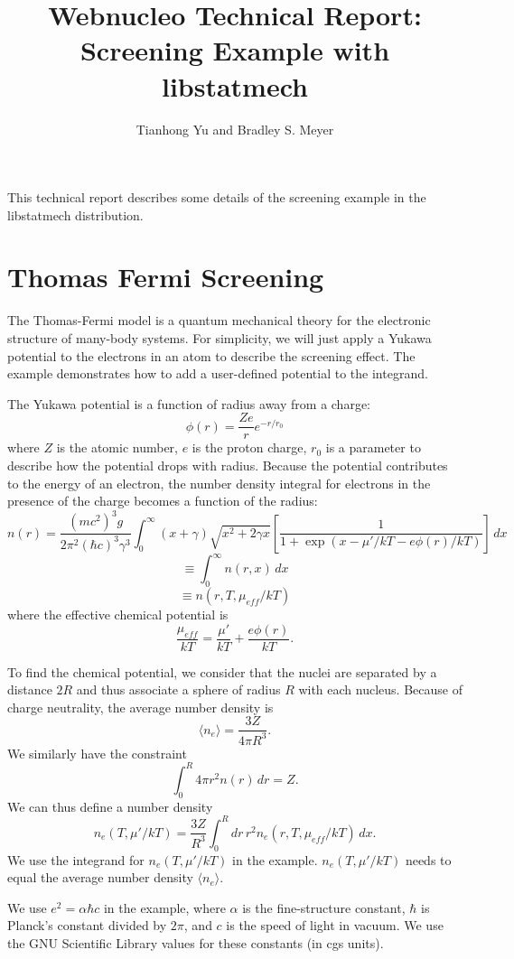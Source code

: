 \documentclass[pdftex]{article}    %
\title{Webnucleo Technical Report: Screening Example with libstatmech}  %
\author{Tianhong Yu and Bradley S. Meyer}
\begin{document}

\maketitle                 %

This technical report describes some details of the screening example
in the libstatmech distribution.

\section{Thomas Fermi Screening}

The Thomas-Fermi model is a quantum mechanical theory for the electronic 
structure of many-body systems. For simplicity, we will just apply a Yukawa 
potential to the electrons in an atom to describe the screening effect. The 
example demonstrates how to add a user-defined potential to the integrand. 

The Yukawa potential is a function of radius away from a charge:
\[
\phi(r) = \frac{Ze}{r} e^{-r/r_0}
\]
where $Z$ is the atomic number, $e$ is the proton charge, $r_0$ is a parameter
to describe how the potential drops with radius.  Because the potential
contributes to the energy of an electron, the number density integral for
electrons in the presence of the charge becomes a function of the radius:
\[
n(r) = \frac {(mc^2)^3g} {2\pi^2(\hbar c)^3\gamma^3}
  \int_0^{\infty} (x+\gamma)\sqrt{x^2+2\gamma x}
  \left[
    \frac{1}{1+{\exp}(x - \mu'/kT - e\phi(r)/kT)}
  \right]
  \, dx
\]
\[
  \equiv
  \int_0^\infty n(r,x) \, dx
\]
\[
  \equiv
  n(r,T,\mu_{eff}/kT)
\]
where the effective chemical potential is
\[
\frac{\mu_{eff}}{kT} = \frac{\mu'}{kT} + \frac{e\phi(r)}{kT}.
\]

To find the chemical potential, we consider that the nuclei are separated
by a distance $2R$ and thus associate a sphere of radius $R$ with each
nucleus.  Because of charge neutrality, the average number density is
\[
\langle n_e \rangle = \frac{3Z}{4\pi R^3}.
\]
We similarly have the constraint
\[
\int_0^R 4 \pi r^2 n(r) \, dr = Z.
\]
We can thus define a number density
\[
n_e( T, \mu'/kT ) = \frac{3Z}{R^3} \int_0^R dr \, r^2 n_e(r,T,\mu_{eff}/kT)
\, dx.
\]
We use the integrand for $n_e( T, \mu'/kT )$ in the example.
$n_e( T, \mu'/kT )$ needs to
equal the average number density $\langle n_e \rangle$.

We use $e^2 = \alpha \hbar c$ in the example, where
$\alpha$ is the fine-structure constant, $\hbar$ is Planck's constant divided
by $2\pi$, and $c$ is the speed of light in vacuum.  We use the GNU
Scientific Library values for these constants (in cgs units).
\end{document}
